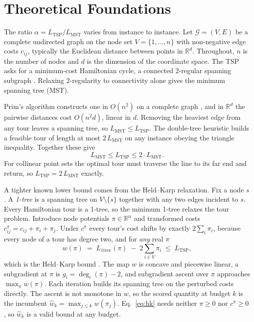 \documentclass{article}
\begin{document}
\section{Theoretical Foundations} \label{sec:theory}

The ratio $\alpha=L_{\mathrm{TSP}}/L_{\mathrm{MST}}$ varies from instance to instance. Let $\mathcal{G}=(V,E)$ be a complete undirected graph on the node set $V=\{1,\dots,n\}$ with non-negative edge costs $c_{ij}$, typically the Euclidean distance between points in $\mathbb{R}^d$. Throughout, $n$ is the number of nodes and $d$ is the dimension of the coordinate space. The TSP asks for a minimum-cost Hamiltonian cycle, a connected 2-regular spanning subgraph \citep{dantzig1954solution,concorde2006}. Relaxing 2-regularity to connectivity alone gives the minimum spanning tree (MST).

Prim's algorithm constructs one in $O(n^2)$ on a complete graph \citep{prim1957}, and in $\mathbb{R}^d$ the pairwise distances cost $O(n^2 d)$, linear in $d$. Removing the heaviest edge from any tour leaves a spanning tree, so $L_{\mathrm{MST}} \le L_{\mathrm{TSP}}$. The double-tree heuristic \citep{rosenkrantz1977} builds a feasible tour of length at most $2\,L_{\mathrm{MST}}$ on any instance obeying the triangle inequality. Together these give
\begin{equation} \label{eq:bounds}
    L_{\mathrm{MST}} \le L_{\mathrm{TSP}} \le 2 \cdot L_{\mathrm{MST}}.
\end{equation}
For collinear point sets the optimal tour must traverse the line to its far end and return, so $L_{\mathrm{TSP}} = 2\,L_{\mathrm{MST}}$ exactly.

A tighter known lower bound comes from the Held--Karp relaxation. Fix a node $s$. A \emph{1-tree} is a spanning tree on $V\setminus\{s\}$ together with any two edges incident to $s$. Every Hamiltonian tour is a 1-tree, so the minimum 1-tree relaxes the tour problem. Introduce node potentials $\pi\in\mathbb{R}^{n}$ and transformed costs $c^{\pi}_{ij}=c_{ij}+\pi_i+\pi_j$. Under $c^{\pi}$ every tour's cost shifts by exactly $2\sum_i\pi_i$, because every node of a tour has degree two, and for \emph{any} real $\pi$
\begin{equation} \label{eq:hk}
    w(\pi) \;=\; L_{\mathrm{1tree}}(\pi) \;-\; 2\sum_{i\in V}\pi_i \;\le\; L_{\mathrm{TSP}},
\end{equation}
which is the Held--Karp bound \citep{heldkarp1970,heldkarp1971}. The map $w$ is concave and piecewise linear, a subgradient at $\pi$ is $g_i=\deg_i(\pi)-2$, and subgradient ascent over $\pi$ approaches $\max_\pi w(\pi)$. Each iteration builds its spanning tree on the perturbed costs directly. The ascent is not monotone in $w$, so the scored quantity at budget $k$ is the incumbent $\hat w_k=\max_{j\le k}w(\pi_j)$. Eq.~\eqref{eq:hk} needs neither $\pi\ge0$ nor $c^{\pi}\ge0$, so $\hat w_k$ is a valid bound at any budget.
\end{document}
